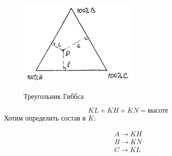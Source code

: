 \begin{lecture}
	\begin{lecSection}
		\begin{figure}
			\centering\includegraphics[width=\linewidth]{lecture_08/new_triangle_gibbs}
			\label{fig:triangle_gibbs}
			\caption{Треугольник Гиббса}
		\end{figure}
		\begin{equation*}
			KL + KH + KN = \text{высоте}
		\end{equation*}
		Хотим определить состав в $ K $:
		\begin{center}\noindent\begin{gather*}
		A \rightarrow KH \\
		B \rightarrow KN \\
		C \rightarrow KL
		\end{gather*}\end{center}
	\end{lecSection}


\end{lecture}
